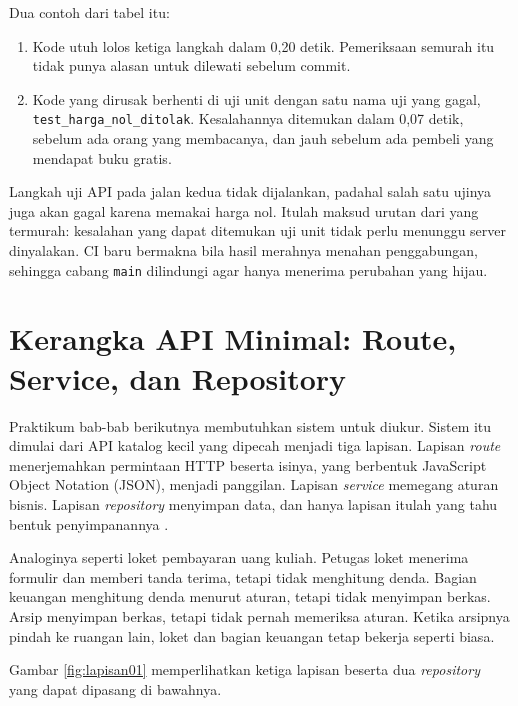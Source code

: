 Dua contoh dari tabel itu:
\begin{enumerate}
  \item Kode utuh lolos ketiga langkah dalam 0,20 detik. Pemeriksaan
        semurah itu tidak punya alasan untuk dilewati sebelum commit.
  \item Kode yang dirusak berhenti di uji unit dengan satu nama uji yang
        gagal, \texttt{test\_harga\_nol\_ditolak}. Kesalahannya ditemukan dalam
        0,07 detik, sebelum ada orang yang membacanya, dan jauh sebelum ada
        pembeli yang mendapat buku gratis.
\end{enumerate}

Langkah uji API pada jalan kedua tidak dijalankan, padahal salah satu ujinya
juga akan gagal karena memakai harga nol. Itulah maksud urutan dari yang
termurah: kesalahan yang dapat ditemukan uji unit tidak perlu menunggu server
dinyalakan. CI baru bermakna bila hasil merahnya menahan penggabungan, sehingga
cabang \texttt{main} dilindungi agar hanya menerima perubahan yang hijau.

\section{Kerangka API Minimal: Route, Service, dan Repository}

Praktikum bab-bab berikutnya membutuhkan sistem untuk diukur. Sistem itu
dimulai dari API katalog kecil yang dipecah menjadi tiga lapisan. Lapisan
\textit{route} menerjemahkan permintaan HTTP beserta isinya, yang berbentuk
JavaScript Object Notation (JSON), menjadi panggilan. Lapisan \textit{service}
memegang aturan bisnis. Lapisan \textit{repository} menyimpan data, dan
hanya lapisan itulah yang tahu bentuk penyimpanannya \cite{fowler2002poeaa}.

Analoginya seperti loket pembayaran uang kuliah. Petugas loket menerima
formulir dan memberi tanda terima, tetapi tidak menghitung denda. Bagian
keuangan menghitung denda menurut aturan, tetapi tidak menyimpan berkas.
Arsip menyimpan berkas, tetapi tidak pernah memeriksa aturan. Ketika arsipnya
pindah ke ruangan lain, loket dan bagian keuangan tetap bekerja seperti biasa.

Gambar \ref{fig:lapisan01} memperlihatkan ketiga lapisan beserta dua
\textit{repository} yang dapat dipasang di bawahnya.

